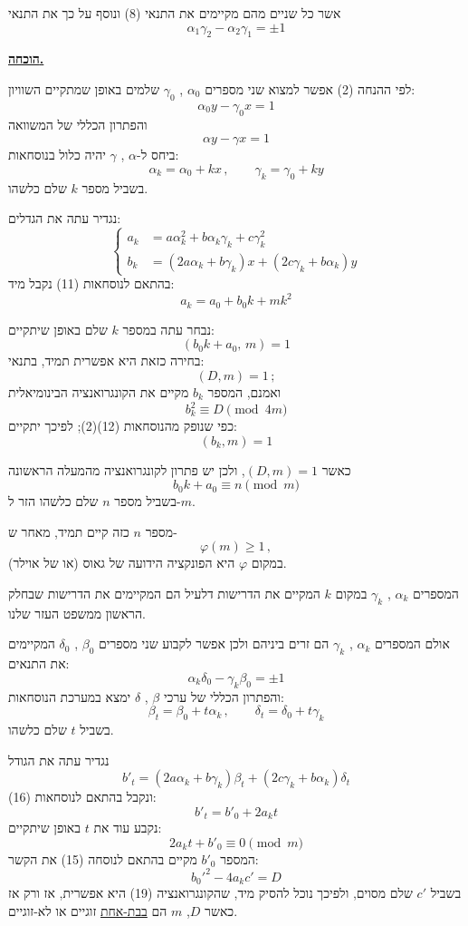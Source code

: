 \noindent אשר כל שניים מהם מקיימים את התנאי (8) ונוסף על כך את התנאי
\[ \alpha_1\gamma_2 - \alpha_2\gamma_1 = \pm 1 \tag{9} \]

\bigskip
\noindent\textbf{\underline{הוכחה.}}

\noindent לפי ההנחה (2) אפשר למצוא שני מספרים $\alpha_0$ , $\gamma_0$ שלמים באופן שמתקיים השוויון:
\[ \alpha_0y - \gamma_0x = 1 \]
\noindent והפתרון הכללי של המשוואה
\[ \alpha y - \gamma x = 1 \tag{10} \]
\noindent ביחס ל-$\alpha$ , $\gamma$ יהיה כלול בנוסחאות:
\[ \alpha_k = \alpha_0 + kx \, , \qquad \gamma_k = \gamma_0 + ky \tag{11} \]
\noindent בשביל מספר $k$ שלם כלשהו.

\noindent נגדיר עתה את הגדלים:
\[ \left\{ \begin{aligned} a_k &= a\alpha_k^2 + b\alpha_k\gamma_k + c\gamma_k^2 \\ b_k &= (2a\alpha_k+b\gamma_k)x + (2c\gamma_k+b\alpha_k)y \end{aligned} \right. \tag{12} \]
\noindent בהתאם לנוסחאות (11) נקבל מיד:
\[ a_k = a_0 + b_0k + mk^2 \tag{13} \]

\noindent נבחר עתה במספר $k$ שלם באופן שיתקיים:
\[ (b_0k+a_0,\, m) = 1 \tag{14} \]
\noindent בחירה כזאת היא אפשרית תמיד, בתנאי:
\[ (D,m) = 1 \, ; \]
\noindent ואמנם, המספר $b_k$ מקיים את הקונגרואנציה הבינומיאלית
\[ b_k^2 \equiv D \pmod{4m} \]
\noindent כפי שנופק מהנוסחאות (12)(2); לפיכך יתקיים:
\[ (b_k,m) = 1 \]

\noindent כאשר $(D,m)=1$, ולכן יש פתרון לקונגרואנציה מהמעלה הראשונה
\[ b_0k + a_0 \equiv n \pmod{m} \]
\noindent בשביל מספר $n$ שלם כלשהו הזר ל-$m$.

\noindent מספר $n$ כזה קיים תמיד, מאחר ש-
\[ \varphi(m) \geq 1 \, , \]
\noindent במקום $\varphi$ היא הפונקציה הידועה של גאוס (או של אוילר).

\noindent המספרים $\alpha_k$ , $\gamma_k$ במקום $k$ המקיים את הדרישות דלעיל הם המקיימים את הדרישות שבחלק הראשון ממשפט העזר שלנו.

\noindent אולם המספרים $\alpha_k$ , $\gamma_k$ הם זרים ביניהם ולכן אפשר לקבוע שני מספרים $\beta_0$ , $\delta_0$ המקיימים את התנאים:
\[ \alpha_k\delta_0 - \gamma_k\beta_0 = \pm 1 \tag{15} \]
\noindent והפתרון הכללי של ערכי $\beta$ , $\delta$ ימצא במערכת הנוסחאות:
\[ \beta_t = \beta_0 + t\alpha_k \, , \qquad \delta_t = \delta_0 + t\gamma_k \tag{16} \]
\noindent בשביל $t$ שלם כלשהו.

\noindent נגדיר עתה את הגודל
\[ b'_t = (2a\alpha_k+b\gamma_k)\beta_t + (2c\gamma_k+b\alpha_k)\delta_t \tag{17} \]
\noindent ונקבל בהתאם לנוסחאות (16):
\[ b'_t = b'_0 + 2a_kt \tag{18} \]
\noindent נקבע עוד את $t$ באופן שיתקיים:
\[ 2a_kt + b'_0 \equiv 0 \pmod{m} \tag{19} \]
\noindent המספר $b'_0$ מקיים בהתאם לנוסחה (15) את הקשר:
\[ b_0'^2 - 4a_kc' = D \tag{20} \]
\noindent בשביל $c'$ שלם מסוים, ולפיכך נוכל להסיק מיד, שהקונגרואנציה (19) היא אפשרית, אז ורק אז כאשר $D$, $m$ הם \underline{בבת-אחת} זוגיים או לא-זוגיים.

